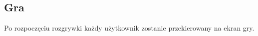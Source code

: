 \documentclass[12pt]{article}
\begin{document}
\newpage
\subsection{Gra}
Po rozpoczęciu rozgrywki każdy użytkownik zostanie przekierowany na ekran gry.
\begin{figure}[!htb]
    \centering
    \centering
\end{figure}
\end{document}

